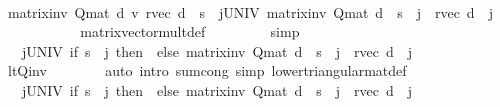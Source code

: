 \begin{isabellebody}
\ {\isacharminus}{\kern0pt}\isanewline
\ \ \ \ \isamarkupfalse%
\ {\isachardoublequoteopen}{\isacharparenleft}{\kern0pt}matrix{\isacharunderscore}{\kern0pt}inv\ {\isacharparenleft}{\kern0pt}Q{\isacharunderscore}{\kern0pt}mat\ d{\isacharparenright}{\kern0pt}\ {\isacharasterisk}{\kern0pt}v\ r{\isacharunderscore}{\kern0pt}vec\ d{\isacharparenright}{\kern0pt}\ {\isachardollar}{\kern0pt}\ s\ {\isacharequal}{\kern0pt}\ {\isacharparenleft}{\kern0pt}{\isasymSum}j{\isasymin}UNIV{\isachardot}{\kern0pt}\ matrix{\isacharunderscore}{\kern0pt}inv\ {\isacharparenleft}{\kern0pt}Q{\isacharunderscore}{\kern0pt}mat\ d{\isacharparenright}{\kern0pt}\ {\isachardollar}{\kern0pt}\ s\ {\isachardollar}{\kern0pt}\ j\ {\isacharasterisk}{\kern0pt}\ r{\isacharunderscore}{\kern0pt}vec\ d\ {\isachardollar}{\kern0pt}\ j{\isacharparenright}{\kern0pt}{\isachardoublequoteclose}\ \ \ \ \isanewline
\ \ \ \ \ \ \isamarkupfalse%
\ matrix{\isacharunderscore}{\kern0pt}vector{\isacharunderscore}{\kern0pt}mult{\isacharunderscore}{\kern0pt}def\ \isanewline
\ \ \ \ \ \ \isamarkupfalse%
\ simp\isanewline
\ \ \ \ \isamarkupfalse%
\ \isamarkupfalse%
\ {\isachardoublequoteopen}{\isasymdots}\ {\isacharequal}{\kern0pt}\ {\isacharparenleft}{\kern0pt}{\isasymSum}j{\isasymin}UNIV{\isachardot}{\kern0pt}\ if\ s\ {\isacharless}{\kern0pt}\ j\ then\ {}\ else\ matrix{\isacharunderscore}{\kern0pt}inv\ {\isacharparenleft}{\kern0pt}Q{\isacharunderscore}{\kern0pt}mat\ d{\isacharparenright}{\kern0pt}\ {\isachardollar}{\kern0pt}\ s\ {\isachardollar}{\kern0pt}\ j\ {\isacharasterisk}{\kern0pt}\ r{\isacharunderscore}{\kern0pt}vec\ d\ {\isachardollar}{\kern0pt}\ j{\isacharparenright}{\kern0pt}{\isachardoublequoteclose}\isanewline
\ \ \ \ \ \ \isamarkupfalse%
\ lt{\isacharunderscore}{\kern0pt}Q{\isacharunderscore}{\kern0pt}inv\isanewline
\ \ \ \ \ \ \isamarkupfalse%
\ {\isacharparenleft}{\kern0pt}auto\ intro{\isacharbang}{\kern0pt}{\isacharcolon}{\kern0pt}\ sum{\isachardot}{\kern0pt}cong\ simp{\isacharcolon}{\kern0pt}\ lower{\isacharunderscore}{\kern0pt}triangular{\isacharunderscore}{\kern0pt}mat{\isacharunderscore}{\kern0pt}def{\isacharparenright}{\kern0pt}\isanewline
\ \ \ \ \isamarkupfalse%
\ \isamarkupfalse%
\ {\isachardoublequoteopen}{\isasymdots}\ {\isacharequal}{\kern0pt}\ {\isacharparenleft}{\kern0pt}{\isasymSum}j{\isasymin}UNIV{\isachardot}{\kern0pt}\ if\ s\ {\isacharless}{\kern0pt}\ j\ then\ {}\ else\ matrix{\isacharunderscore}{\kern0pt}inv\ {\isacharparenleft}{\kern0pt}Q{\isacharunderscore}{\kern0pt}mat\ d{\isacharprime}{\kern0pt}{\isacharparenright}{\kern0pt}\ {\isachardollar}{\kern0pt}\ s\ {\isachardollar}{\kern0pt}\ j\ {\isacharasterisk}{\kern0pt}\ r{\isacharunderscore}{\kern0pt}vec\ d\ {\isachardollar}{\kern0pt}\ j{\isacharparenright}{\kern0pt}{\isachardoublequoteclose}\isanewline

\end{isabellebody}
